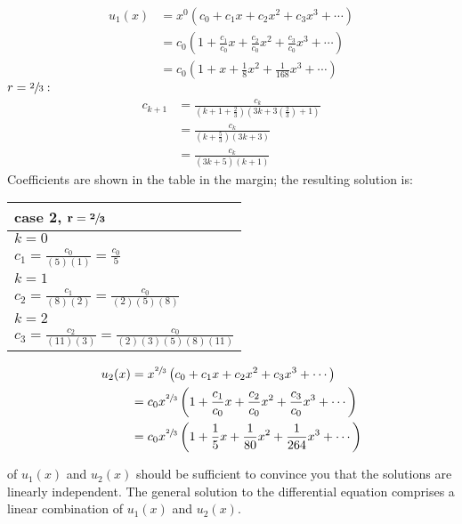 \begin{align*}
u_1(x) &= x^0\left(c_0 + c_1x + c_2x^2 + c_3x^3 + \cdots \right) \\
&= c_0\left(1 + \frac{c_1}{c_0}x + \frac{c_2}{c_0}x^2 + \frac{c_3}{c_0}x^3 + \cdots \right) \\
&= c_0\left(1+x+\frac{1}{8}x^2+\frac{1}{168}x^3+\cdots \right)
\end{align*}
\vspace{0.25cm}
\noindent$r=\sfrac{2}{3}:$
\begin{align*}
c_{k+1} &=\frac{c_k}{(k+1+\frac{2}{3})(3k+3\left(\frac{2}{3}\right)+1)}\\
&=\frac{c_k}{\left(k+\frac{5}{3}\right)(3k+3)} \\
&=\frac{c_k}{(3k+5)(k+1)}
\end{align*}
\noindent Coefficients are shown in the table in the margin; the resulting solution is:
\begin{margintable}
\begin{tabular}{|l|}
\hline
\textbf{case 2, } $\mathbf{r=\sfrac{2}{3}}$ \\\hline
$k=0$ \\
$c_1 = \frac{c_0}{(5)(1)} = \frac{c_0}{5}$ \\\hline
$k=1$ \\
$c_2 = \frac{c_1}{(8)(2)} = \frac{c_0}{(2)(5)(8)}$ \\\hline
$k=2$ \\
$c_3 = \frac{c_2}{(11)(3)} = \frac{c_0}{(2)(3)(5)(8)(11)}$\\\hline
\end{tabular}
\end{margintable}
\begin{align*}
u_2(x) &= x^{\sfrac{2}{3}}\left(c_0 + c_1x + c_2x^2 + c_3x^3 + \cdots \right) \\
&= c_0x^{\sfrac{2}{3}}\left(1 + \frac{c_1}{c_0}x+\frac{c_2}{c_0}x^2+\frac{c_3}{c_0}x^3 + \cdots \right) \\
&= c_0x^{\sfrac{2}{3}}\left(1+\frac{1}{5}x + \frac{1}{80}x^2+\frac{1}{264}x^3 + \cdots  \right)
\end{align*}

 of $u_1(x)$ and $u_2(x)$ should be sufficient to convince you that the solutions are linearly independent.  The general solution to the differential equation comprises a linear combination of $u_1(x)$ and $u_2(x)$.


